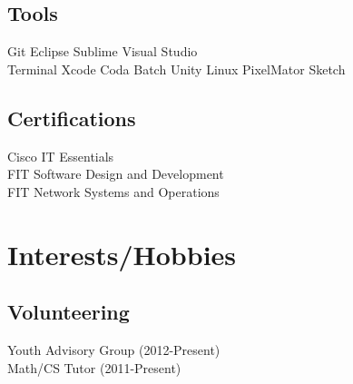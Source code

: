 \documentclass[]{deedy-resume-openfont}
\begin{document}
\begin{minipage}[t]{0.33\textwidth}
\subsection{Tools}
Git \textbullet{} Eclipse \textbullet{} Sublime \textbullet{} Visual Studio\\
\vspace{1mm}
Terminal \textbullet{} Xcode \textbullet{} Coda \textbullet{} Batch \textbullet{} Unity \textbullet{} Linux \textbullet{} PixelMator \textbullet{} Sketch 
\sectionsep

\subsection{Certifications}
Cisco IT Essentials\\
FIT Software Design and Development \\
FIT Network Systems and Operations \\
\sectionsep
\vspace{2mm}

\section{Interests/Hobbies}

\subsection{Volunteering}
Youth Advisory Group (2012-Present)\\
Math/CS Tutor (2011-Present)\\
\vspace{2mm}


\end{minipage}
\end{document}
